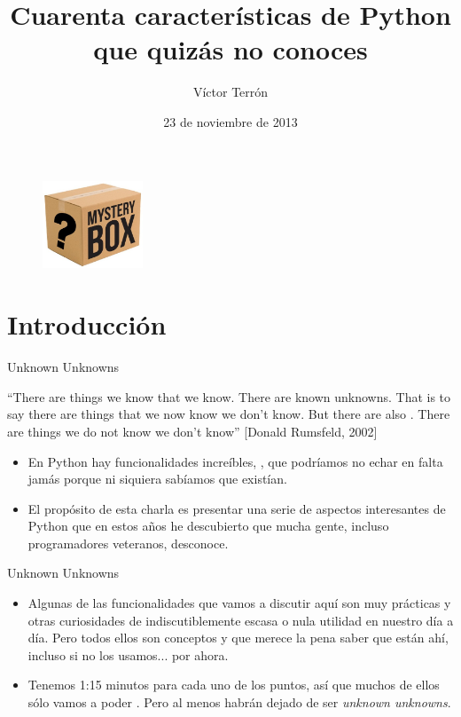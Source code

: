 \documentclass[14pt]{beamer}
\title{Cuarenta características de Python\\ que quizás no conoces}
\author{Víctor Terrón}
\date{23 de noviembre de 2013}
\institute{IAA-CSIC}
\begin{document}
\begin{frame}
  \titlepage
  \begin{figure}
    \vspace{-0.5cm}
    \includegraphics[width=3cm]{pics/mistery-box.jpg}
  \end{figure}
\end{frame}

\section{Introducción}

\begin{frame}{Unknown Unknowns}
  \small
  \begin{block}{}
    \centering
    ``There are things we know that we know. There are known
    unknowns. That is to say there are things that we now know we
    don't know. But there are also . There
    are things we do not know we don't know'' [Donald Rumsfeld, 2002]
  \end{block}

  \small
  \begin{itemize}
    \item En Python hay funcionalidades increíbles,
     , que
     podríamos no echar en falta jamás porque ni siquiera sabíamos
     que existían.
    \item El propósito de esta charla es presentar una serie de
      aspectos interesantes de Python que en estos años he descubierto
      que mucha gente, incluso programadores veteranos, desconoce.
  \end{itemize}
\end{frame}

\begin{frame}{Unknown Unknowns}
  \begin{itemize}
    \item Algunas de las funcionalidades que vamos a discutir aquí son
      muy prácticas y otras curiosidades de indiscutiblemente escasa o
      nula utilidad en nuestro día a día. Pero todos ellos son
      conceptos  y que merece la pena
      saber que están ahí, incluso si no los usamos... por ahora.
    \item Tenemos 1:15 minutos para cada uno de los puntos, así que
      muchos de ellos sólo vamos a poder . Pero al menos habrán dejado de ser \emph{unknown
      unknowns}.
  \end{itemize}
\end{frame}
\end{document}
